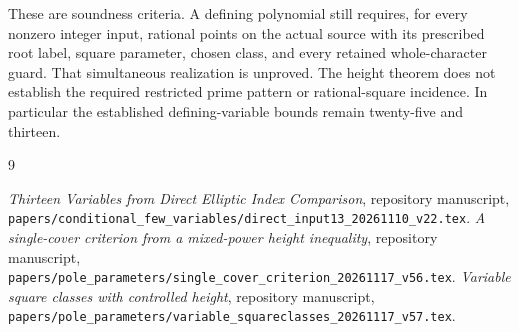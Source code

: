 \documentclass[11pt,a4paper]{article}
\begin{document}
These are soundness criteria. A defining polynomial still requires,
for every nonzero integer input, rational points on the actual source
with its prescribed root label, square parameter, chosen class, and
every retained whole-character guard. That simultaneous realization
is unproved. The height theorem does not establish the required
restricted prime pattern or rational-square incidence. In particular
the established defining-variable bounds remain twenty-five and
thirteen.

\begin{thebibliography}{9}\raggedright
{}\emph{Thirteen Variables from Direct Elliptic
Index Comparison}, repository manuscript,
\nolinkurl{papers/conditional_few_variables/direct_input13_20261110_v22.tex}.
\emph{A single-cover criterion from a mixed-power
height inequality}, repository manuscript,
\nolinkurl{papers/pole_parameters/single_cover_criterion_20261117_v56.tex}.
\emph{Variable square classes with controlled height},
repository manuscript,
\nolinkurl{papers/pole_parameters/variable_squareclasses_20261117_v57.tex}.
\end{thebibliography}
\end{document}
